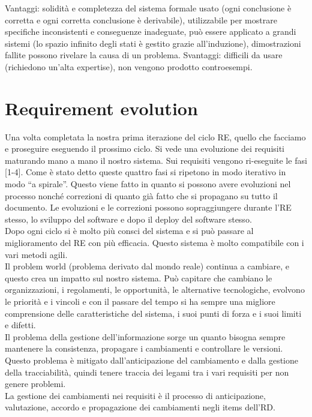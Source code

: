      Vantaggi: solidità e completezza del sistema formale usato (ogni conclusione è corretta e ogni corretta conclusione è derivabile), utilizzabile per mostrare specifiche inconsistenti e conseguenze inadeguate, può essere applicato a grandi sistemi (lo spazio infinito degli stati è gestito grazie all’induzione), dimostrazioni fallite possono rivelare la causa di un problema.
     Svantaggi: difficili da usare (richiedono un’alta expertise), non vengono prodotto controesempi.

\section{Requirement evolution} 
Una volta completata la nostra prima iterazione del ciclo RE, quello che facciamo e proseguire eseguendo il prossimo ciclo. Si vede una evoluzione dei requisiti maturando mano a mano il nostro sistema. Sui requisiti vengono ri-eseguite le fasi [1-4].
Come è stato detto queste quattro fasi si ripetono in modo iterativo in modo “a spirale”. Questo viene fatto in quanto si possono avere evoluzioni nel processo nonché correzioni di quanto già fatto che si propagano su tutto il documento. Le evoluzioni e le correzioni possono sopraggiungere durante l’RE stesso, lo sviluppo del software e dopo il deploy del software stesso.\\
Dopo ogni ciclo si è molto più consci del sistema e si può passare al miglioramento del RE con più efficacia. Questo sistema è molto compatibile con i vari metodi agili.\\

Il problem world (problema derivato dal mondo reale) continua a cambiare, e questo crea un impatto sul nostro sistema. Può capitare che cambiano le organizzazioni, i regolamenti, le opportunità, le alternative tecnologiche, evolvono le priorità e i vincoli e con il passare del tempo si ha sempre una migliore comprensione delle caratteristiche del sistema, i suoi punti di forza e i suoi limiti e difetti.\\

Il problema della gestione dell’informazione sorge un quanto bisogna sempre mantenere la consistenza, propagare i cambiamenti e controllare le versioni. Questo problema è mitigato dall’anticipazione del cambiamento e dalla gestione della tracciabilità, quindi tenere traccia dei legami tra i vari requisiti per non genere problemi.\\
La gestione dei cambiamenti nei requisiti è il processo di anticipazione, valutazione, accordo e propagazione dei cambiamenti negli items dell’RD.

